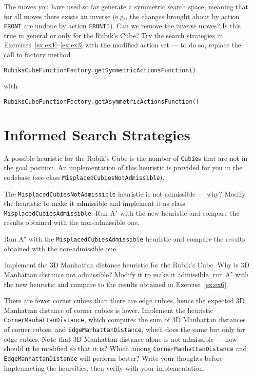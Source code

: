 \documentclass[a4paper]{article}
\begin{document}
{\ex{}\label{ex:ex4} The moves you have used so far generate a symmetric search space, meaning that for all moves there exists an inverse (e.g., the changes brought about by action {\tt FRONT} are undone by action {\tt FRONTI}).  Can we remove the inverse moves? Is this true in general or only for the Rubik's Cube? Try the search strategies in Exercises~\ref{ex:ex1}--\ref{ex:ex3} with the modified action set --- to do so, replace the call to factory method
\begin{verbatim}
RubiksCubeFunctionFactory.getSymmetricActionsFunction()
\end{verbatim}
with
\begin{verbatim}
RubiksCubeFunctionFactory.getAsymmetricActionsFunction()
\end{verbatim}
\vspace{0.1cm}}


\section{Informed Search Strategies}
A possible heuristic for the Rubik's Cube is the number of {\tt Cubie}s that are not in the goal position.  An implementation of this heuristic is provided for you in the codebase (see class {\tt MisplacedCubiesNotAdmissible}).

{\ex{}\label{ex:ex5} The {\tt MisplacedCubiesNotAdmissible} heuristic is not admissible --- why?  Modify the heuristic to make it admissible and implement it as class {\tt MisplacedCubiesAdmissible}. Run $\text{A}^\star$ with the new heuristic and compare the results obtained with the non-admissible one.\vspace{0.1cm}}

{\ex{}\label{ex:ex6} Run $\text{A}^\star$ with the {\tt MisplacedCubiesAdmissible} heuristic and compare the results obtained with the non-admissible one.\vspace{0.1cm}}

{\ex{}\label{ex:ex7} Implement the 3D Manhattan distance heuristic for the Rubik's Cube.  Why is 3D Manhattan distance not admissible?  Modify it to make it admissible, run $\text{A}^\star$ with the new heuristic and compare to the results obtained in Exercise~\ref{ex:ex6}.\vspace{0.1cm}}

{\ex{}\label{ex:ex8} There are fewer corner cubies than there are edge cubies, hence the expected 3D Manhattan distance of corner cubies is lower.  Implement the heuristic {\tt CornerManhattanDistance}, which computes the sum of 3D Manhattan distances of corner cubies, and {\tt EdgeManhattanDistance}, which does the same but only for edge cubies.  Note that 3D Manhattan distance alone is not admissible --- how should it be modified so that it is?  Which among {\tt CornerManhattanDistance} and {\tt EdgeManhattanDistance} will perform better?  Write your thoughts before implemneting the heursitics, then verify with your implementation.\vspace{0.1cm}}
\end{document}

